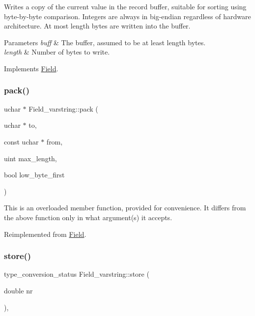 Writes a copy of the current value in the record buffer, suitable for sorting using byte-\/by-\/byte comparison. Integers are always in big-\/endian regardless of hardware architecture. At most length bytes are written into the buffer.


\begin{DoxyParams}{Parameters}
{\em buff} & The buffer, assumed to be at least length bytes.\\
\hline
{\em length} & Number of bytes to write. \\
\hline
\end{DoxyParams}


Implements \mbox{\hyperlink{classField_af3bc27d237b6ae6ef3dc7a2aec3d79ac}{Field}}.

\mbox{\label{classField__varstring_a4e54b98a33cc68aa2c137a88a317f040}} 
\subsubsection{\texorpdfstring{pack()}{pack()}}
{\footnotesize\ttfamily uchar $\ast$ Field\+\_\+varstring\+::pack (\begin{DoxyParamCaption}\item[{uchar $\ast$}]{to,  }\item[{const uchar $\ast$}]{from,  }\item[{uint}]{max\+\_\+length,  }\item[{bool}]{low\+\_\+byte\+\_\+first }\end{DoxyParamCaption})\hspace{0.3cm}{\ttfamily [virtual]}}

This is an overloaded member function, provided for convenience. It differs from the above function only in what argument(s) it accepts.

Reimplemented from \mbox{\hyperlink{classField_a9eaff8d3425ef0e1da69b32cbd8f2879}{Field}}.

\mbox{\label{classField__varstring_ad54d8ec0e88d58ffde65168643155434}} 
\subsubsection{\texorpdfstring{store()}{store()}}
{\footnotesize\ttfamily type\+\_\+conversion\+\_\+status Field\+\_\+varstring\+::store (\begin{DoxyParamCaption}\item[{double}]{nr }\end{DoxyParamCaption})\hspace{0.3cm}{\ttfamily [inline]}, {\ttfamily [virtual]}}

